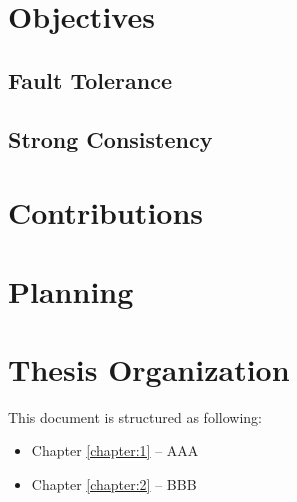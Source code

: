 \section{Objectives}
\subsection{Fault Tolerance}
\subsection{Strong Consistency}


\section{Contributions}
\section{Planning}

\section{Thesis Organization}


This document is structured as following: 
\begin{itemize}
\item Chapter \ref{chapter:1} – AAA 
\item Chapter \ref{chapter:2} – BBB 
\end{itemize}

